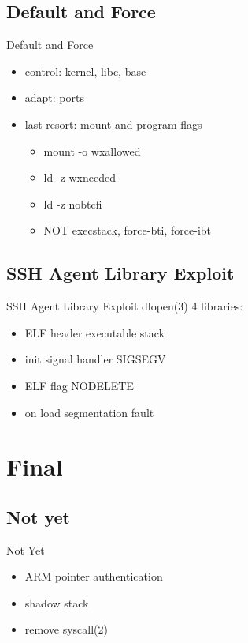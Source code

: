 \documentclass[14pt,aspectratio=169]{beamer}
\begin{document}
\subsection{Default and Force}
\begin{frame}{Default and Force}
\begin{itemize}
  \item control: kernel, libc, base
  \item adapt: ports
  \item last resort: mount and program flags
  \begin{itemize}
    \item mount -o wxallowed
    \item ld -z wxneeded
    \item ld -z nobtcfi
    \item NOT execstack, force-bti, force-ibt
  \end{itemize}
\end{itemize}
\end{frame}

\subsection{SSH Agent Library Exploit}
\begin{frame}{SSH Agent Library Exploit}
dlopen(3) 4 libraries:
\begin{itemize}
  \item ELF header executable stack 
  \item init signal handler SIGSEGV
  \item ELF flag NODELETE
  \item on load segmentation fault
\end{itemize}
\end{frame}

\section{Final}

\subsection{Not yet}
\begin{frame}{Not Yet}
\begin{itemize}
  \item ARM pointer authentication
  \item shadow stack
  \item remove syscall(2)
\end{itemize}
\end{frame}
\end{document}
